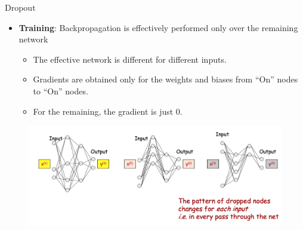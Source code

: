 \documentclass[serif, aspectratio=169]{beamer}
\begin{document}
\begin{frame}{Dropout}
	\begin{itemize}
		\item \textbf{Training}: Backpropagation is effectively performed only over the remaining network
		\begin{itemize}
			\item The effective network is different for different inputs.
			\item Gradients are obtained only for the weights and biases from “On” nodes to “On” nodes.
			\item For the remaining, the gradient is just 0.
		\end{itemize}
	\end{itemize}
	
	\begin{figure}[htpb]
		\begin{center}
			\includegraphics[keepaspectratio, scale=0.23]{pic/dropout3}
		\end{center}
	\end{figure}
\end{frame}
\end{document}
